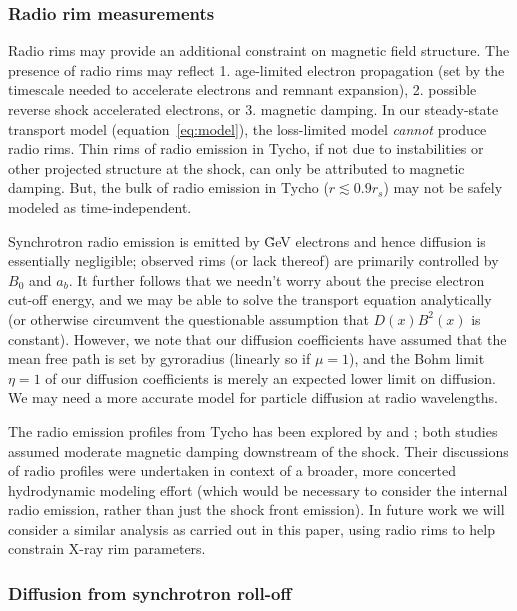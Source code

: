 \documentclass[iop, apj, numberedappendix]{emulateapj}
\begin{document}
\subsubsection{Radio rim measurements}

Radio rims may provide an additional constraint on magnetic field structure.
The presence of radio rims may reflect 1. age-limited electron propagation (set
by the timescale needed to accelerate electrons and remnant expansion), 2.
possible reverse shock accelerated electrons, or 3. magnetic damping.  In our
steady-state transport model (equation~\eqref{eq:model}), the loss-limited
model \emph{cannot} produce radio rims.  Thin rims of radio emission in Tycho,
if not due to instabilities or other projected structure at the shock, can only
be attributed to magnetic damping.  But, the bulk of radio emission in Tycho
($r \lesssim 0.9 r_s$) may not be safely modeled as time-independent.

Synchrotron radio emission is emitted by \~ GeV electrons and hence diffusion
is essentially negligible; observed rims (or lack thereof) are primarily
controlled by $B_0$ and $a_b$.  It further follows that we needn't worry about
the precise electron cut-off energy, and we may be able to solve the transport
equation analytically (or otherwise circumvent the questionable assumption that
$D(x) B^2(x)$ is constant).  However, we note that our diffusion coefficients
have assumed that the mean free path is set by gyroradius (linearly so if
$\mu = 1$), and the Bohm limit $\eta = 1$ of our diffusion coefficients is
merely an expected lower limit on diffusion.  We may need a more accurate model
for particle diffusion at radio wavelengths.

The radio emission profiles from Tycho has been explored by
\citet{cassam-chenai2007} and \citet{morlino2012}; both studies assumed
moderate magnetic damping downstream of the shock.  Their discussions of radio
profiles were undertaken in context of a broader, more concerted hydrodynamic
modeling effort (which would be necessary to consider the internal radio
emission, rather than just the shock front emission).  In future work we will
consider a similar analysis as carried out in this paper, using radio rims to
help constrain X-ray rim parameters.

\subsubsection{Diffusion from synchrotron roll-off}
\end{document}
